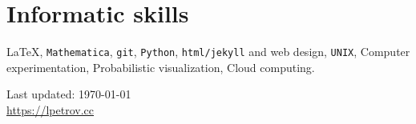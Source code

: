 \documentclass[letterpaper,11pt]{article}
\def\footerlink{https://lpetrov.cc}
\begin{document}
\section*{Informatic skills}

\LaTeX, \texttt{Mathematica}, 
\texttt{git}, \texttt{Python},
\texttt{html/jekyll} and web design, \texttt{UNIX},
Computer experimentation,
Probabilistic visualization, 
Cloud computing.

\bigskip

\begin{center}
	\begin{footnotesize}
		Last updated: \today \\ \href{\footerlink}{\url{\footerlink}}
	\end{footnotesize}
\end{center}
\end{document}
